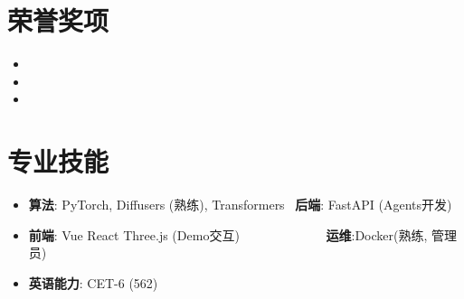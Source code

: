 \documentclass[UTF8,AutoFakeBold]{resume}
\begin{document}
\section{\hspace{0.25em}\makebox[0.75em][c]{\faTrophy} \fangsong\textbf{荣誉奖项}}
    \vspace{0.1em}
    \begin{itemize}
        \item {}
        \item {}
\item {}
    \end{itemize}
\section{\hspace{0.25em}\makebox[0.75em][c]{\faPuzzlePiece} \fangsong\textbf{专业技能}}
\noindent
    \begin{minipage}[t]{0.75\textwidth}
     \raggedright
        \begin{itemize}
            \item \kaishu\textbf{算法}: PyTorch, Diffusers (熟练), Transformers ~\textbf{后端}: FastAPI (Agents开发)
            \item \textbf{前端}: Vue React Three.js (Demo交互) ~~~~~~~~~~~~~\textbf{运维}:Docker(熟练, 管理员) 
        \end{itemize}
    \end{minipage}%
    \begin{minipage}[t]{0.5\textwidth}
        \begin{itemize}
            \item \kaishu\textbf{英语能力}: CET-6 (562)
        \end{itemize}
    \end{minipage}
\end{document}
